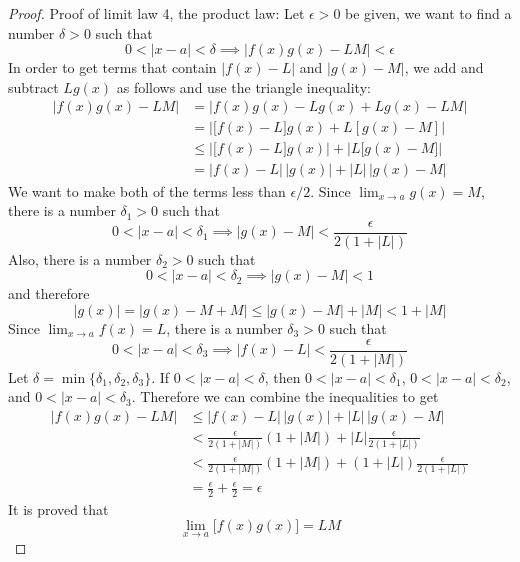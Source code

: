 \begin{proof}
    Proof of limit law 4, the product law:
    Let \(\epsilon>0\) be given, we want to find a number \(\delta>0\) such
    that \[0<|x-a|<\delta\implies|f(x)g(x)-LM|<\epsilon\]
    In order to get terms that contain \(|f(x)-L|\) and \(|g(x)-M|\), we add
    and subtract \(Lg(x)\) as follows and use the triangle inequality:
    \begin{align*}
        |f(x)g(x)-LM| &= |f(x)g(x)-Lg(x)+Lg(x)-LM| \\
        &= \left|\bigl[f(x)-L\bigr]g(x)+L[g(x)-M]\right| \\
        &\leq \left|\bigl[f(x)-L\bigr]g(x)\right|
        +\left|L\bigl[g(x)-M\bigr]\right| \\
        &= |f(x)-L|\,|g(x)|+|L|\,|g(x)-M|
    \end{align*}
    We want to make both of the terms less than \(\epsilon/2\).
    Since \(\displaystyle{\lim_{x\to a}g(x)=M}\),
    there is a number \(\delta_1>0\) such that
    \[0<|x-a|<\delta_1\implies|g(x)-M|<\frac{\epsilon}{2(1+|L|)}\]
    Also, there is a number \(\delta_2>0\) such that
    \[0<|x-a|<\delta_2\implies|g(x)-M|<1\] and therefore
    \[|g(x)|=|g(x)-M+M|\leq|g(x)-M|+|M|<1+|M|\]
    Since \(\displaystyle{\lim_{x\to a}f(x)=L}\),
    there is a number \(\delta_3>0\) such that
    \[0<|x-a|<\delta_3\implies|f(x)-L|<\frac{\epsilon}{2(1+|M|)}\]
    Let \(\delta=\min\{\delta_1,\delta_2,\delta_3\}\).
    If \(0<|x-a|<\delta\), then \(0<|x-a|<\delta_1\), \(0<|x-a|<\delta_2\),
    and \(0<|x-a|<\delta_3\).
    Therefore we can combine the inequalities to get
    \begin{align*}
        |f(x)g(x)-LM|
        &\leq |f(x)-L|\,|g(x)|+|L|\,|g(x)-M| \\
        &< \frac{\epsilon}{2(1+|M|)}(1+|M|)+|L|\frac{\epsilon}{2(1+|L|)} \\
        &< \frac{\epsilon}{2(1+|M|)}(1+|M|)
        +(1+|L|)\frac{\epsilon}{2(1+|L|)} \\
        &= \frac{\epsilon}{2}+\frac{\epsilon}{2}=\epsilon
    \end{align*}
    It is proved that
    \[\lim_{x\to a}\bigl[f(x)g(x)\bigr]=LM\]
\end{proof}
